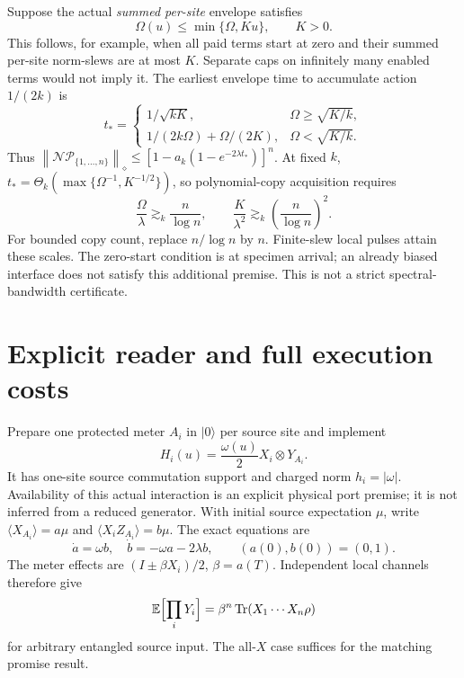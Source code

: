 \documentclass[11pt,a4paper]{article}
\newcommand{\Tr}{\operatorname{Tr}}
\newcommand{\norm}[1]{\left\lVert #1\right\rVert}
\newcommand{\ket}[1]{\lvert #1\rangle}
\newcommand{\Pcal}{\mathcal P}
\newcommand{\Ncal}{\mathcal N}
\begin{document}
Suppose the actual \emph{summed per-site} envelope satisfies
\begin{equation}
 \Omega(u)\le\min\{\Omega,Ku\},\qquad K>0.
\end{equation}
This follows, for example, when all paid terms start at zero and their summed per-site norm-slews are at most $K$. Separate caps on infinitely many enabled terms would not imply it. The earliest envelope time to accumulate action $1/(2k)$ is
\begin{equation}
 t_*=
 \begin{cases}
 1/\sqrt{kK},&\Omega\ge\sqrt{K/k},\\[1mm]
 1/(2k\Omega)+\Omega/(2K),&\Omega<\sqrt{K/k}.
 \end{cases}
\end{equation}
Thus $\norm{\Ncal\Pcal_{\{1,\ldots,n\}}}_\diamond\le[1-a_k(1-e^{-2\lambda t_*})]^n$. At fixed $k$, $t_*=\Theta_k(\max\{\Omega^{-1},K^{-1/2}\})$, so polynomial-copy acquisition requires
\begin{equation}
 \boxed{\frac{\Omega}{\lambda}\gtrsim_k\frac{n}{\log n},\qquad
 \frac{K}{\lambda^2}\gtrsim_k\left(\frac{n}{\log n}\right)^2.}
 \label{eq:slewscale}
\end{equation}
For bounded copy count, replace $n/\log n$ by $n$. Finite-slew local pulses attain these scales. The zero-start condition is at specimen arrival; an already biased interface does not satisfy this additional premise. This is not a strict spectral-bandwidth certificate.

\section{Explicit reader and full execution costs}
\label{sec:meter}

Prepare one protected meter $A_i$ in $\ket0$ per source site and implement
\begin{equation}
 H_i(u)=\frac{\omega(u)}2X_i\otimes Y_{A_i}.
\end{equation}
It has one-site source commutation support and charged norm $h_i=|\omega|$. Availability of this actual interaction is an explicit physical port premise; it is not inferred from a reduced generator. With initial source expectation $\mu$, write $\langle X_{A_i}\rangle=a\mu$ and $\langle X_iZ_{A_i}\rangle=b\mu$. The exact equations are
\begin{equation}
 \dot a=\omega b,\quad\dot b=-\omega a-2\lambda b,
 \qquad(a(0),b(0))=(0,1).
 \label{eq:ode}
\end{equation}
The meter effects are $(I\pm\beta X_i)/2$, $\beta=a(T)$. Independent local channels therefore give
\begin{equation}
 \mathbb E\Bigl[\prod_iY_i\Bigr]=\beta^n\Tr(X_1\cdots X_n\rho)
\end{equation}
for arbitrary entangled source input. The all-$X$ case suffices for the matching promise result.
\end{document}
